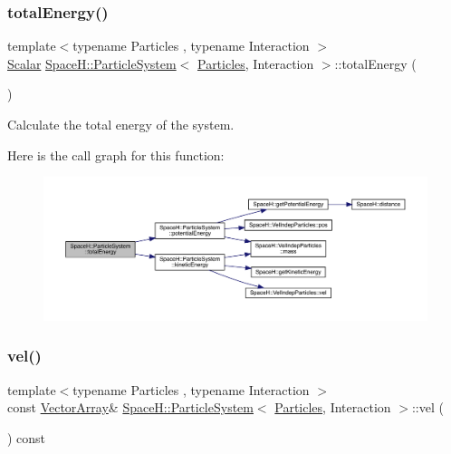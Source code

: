 \subsubsection{\texorpdfstring{total\+Energy()}{totalEnergy()}}
{\footnotesize\ttfamily template$<$typename Particles , typename Interaction $>$ \\
\mbox{\hyperlink{class_space_h_1_1_particle_system_a522770dcfaf8b29aed35ea9348185a34}{Scalar}} \mbox{\hyperlink{class_space_h_1_1_particle_system}{Space\+H\+::\+Particle\+System}}$<$ \mbox{\hyperlink{struct_space_h_1_1_particles}{Particles}}, Interaction $>$\+::total\+Energy (\begin{DoxyParamCaption}{ }\end{DoxyParamCaption})\hspace{0.3cm}{\ttfamily [inline]}}



Calculate the total energy of the system. 

Here is the call graph for this function\+:
\nopagebreak
\begin{figure}[H]
\begin{center}
\leavevmode
\includegraphics[width=350pt]{class_space_h_1_1_particle_system_a9351bf7ed263b6624456e610fd351190_cgraph}
\end{center}
\end{figure}
\mbox{\label{class_space_h_1_1_particle_system_a51c2aae4b2dd9d5aca3c15eb9116ff2d}} 
\subsubsection{\texorpdfstring{vel()}{vel()}\hspace{0.1cm}{\footnotesize\ttfamily [1/2]}}
{\footnotesize\ttfamily template$<$typename Particles , typename Interaction $>$ \\
const \mbox{\hyperlink{class_space_h_1_1_particle_system_acf48c66c8d42b85cd3a77911bb7da9ce}{Vector\+Array}}\& \mbox{\hyperlink{class_space_h_1_1_particle_system}{Space\+H\+::\+Particle\+System}}$<$ \mbox{\hyperlink{struct_space_h_1_1_particles}{Particles}}, Interaction $>$\+::vel (\begin{DoxyParamCaption}{ }\end{DoxyParamCaption}) const\hspace{0.3cm}{\ttfamily [inline]}}



